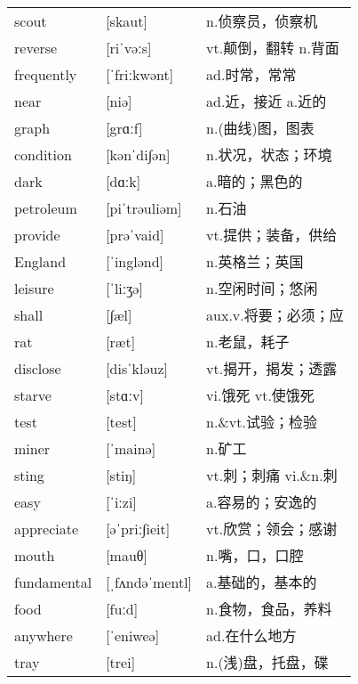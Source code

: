 \documentclass[a4paper]{article}
\begin{document}
\section{}
\begin{tabular}{l l l}

scout & [skaut] & n.侦察员，侦察机 \\
reverse & [riˈvəːs] & vt.颠倒，翻转 n.背面 \\
frequently & [ˈfriːkwənt] & ad.时常，常常 \\
near & [niə] & ad.近，接近 a.近的 \\
graph & [grɑːf] & n.(曲线)图，图表 \\
condition & [kənˈdi∫ən] & n.状况，状态；环境 \\
dark & [dɑːk] & a.暗的；黑色的 \\
petroleum & [piˈtrəuliəm] & n.石油 \\
provide & [prəˈvaid] & vt.提供；装备，供给 \\
England & [ˈinglənd] & n.英格兰；英国 \\
leisure & [ˈliːʒə] & n.空闲时间；悠闲 \\
shall & [∫æl] & aux.v.将要；必须；应 \\
rat & [ræt] & n.老鼠，耗子 \\
disclose & [disˈkləuz] & vt.揭开，揭发；透露 \\
starve & [stɑːv] & vi.饿死 vt.使饿死 \\
test & [test] & n.\&vt.试验；检验 \\
miner & [ˈmainə] & n.矿工 \\
sting & [stiŋ] & vt.刺；刺痛 vi.\&n.刺 \\
easy & [ˈiːzi] & a.容易的；安逸的 \\
appreciate & [əˈpriː∫ieit] & vt.欣赏；领会；感谢 \\
mouth & [mauθ] & n.嘴，口，口腔 \\
fundamental & [ˌfʌndəˈmentl] & a.基础的，基本的 \\
food & [fuːd] & n.食物，食品，养料 \\
anywhere & [ˈeniweə] & ad.在什么地方 \\
tray & [trei] & n.(浅)盘，托盘，碟 \\

\end{tabular}
\end{document}
